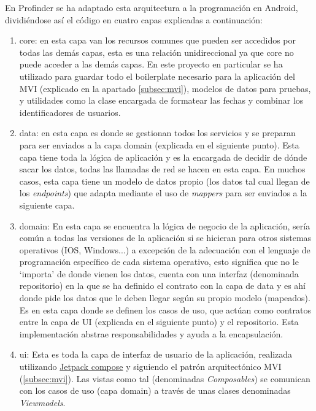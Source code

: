 En Profinder se ha adaptado esta arquitectura a la programación en Android, dividiéndose así el código en cuatro capas explicadas a continuación:
\begin{enumerate}
    \item core: en esta capa van los recursos comunes que pueden ser accedidos por todas las demás capas, esta es una relación unidireccional ya que core no puede acceder a las demás capas. En este proyecto en particular se ha utilizado para guardar todo el boilerplate necesario para la aplicación del MVI (explicado en la apartado \ref{subsec:mvi}), modelos de datos para pruebas, y utilidades como la clase encargada de formatear las fechas y combinar los identificadores de usuarios.
    \item data: en esta capa es donde se gestionan todos los servicios y se preparan para ser enviados a la capa domain (explicada en el siguiente punto). Esta capa tiene toda la lógica de aplicación y es la encargada de decidir de dónde sacar los datos, todas las llamadas de red se hacen en esta capa. En muchos casos, esta capa tiene un modelo de datos propio (los datos tal cual llegan de los \textit{endpoints}) que adapta mediante el uso de \textit{mappers} para ser enviados a la siguiente capa.
    \item domain: En esta capa se encuentra la lógica de negocio de la aplicación, sería común a todas las versiones de la aplicación si se hicieran para otros sistemas operativos (IOS, Windows...) a excepción de la adecuación con el lenguaje de programación específico de cada sistema operativo, esto significa que no le ‘importa’ de donde vienen los datos, cuenta con una interfaz (denominada repositorio) en la que se ha definido el contrato con la capa de data y es ahí donde pide los datos que le deben llegar según su propio modelo (mapeados). Es en esta capa donde se definen los casos de uso, que actúan como contratos entre la capa de UI (explicada en el siguiente punto) y el repositorio. Esta implementación abstrae responsabilidades y ayuda a la encapsulación. 
    \item ui: Esta es toda la capa de interfaz de usuario de la aplicación, realizada utilizando \hyperlink{subsec:compose}{Jetpack compose} y siguiendo el patrón arquitectónico  MVI (\ref{subsec:mvi}). Las vistas como tal (denominadas \textit{Composables}) se comunican con los casos de uso (capa domain) a través de unas clases denominadas \textit{Viewmodels}\hyperlink{cap:biblio}{}.
\end{enumerate}

